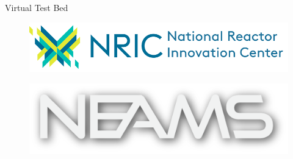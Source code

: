 \documentclass[9pt,t,aspectratio=169]{beamer}
\begin{document}
\begin{frame}{Virtual Test Bed \cite{vtb2023}}
    \begin{figure}
        \centering
        \includegraphics[width=0.65\linewidth]{figures/nric_logo.png}
    \end{figure}
    \begin{figure}
        \centering
        \includegraphics[width=0.6\linewidth]{figures/NEAMS.png}
    \end{figure}
\end{frame}
\hypersetup{citecolor=black}
\end{document}
